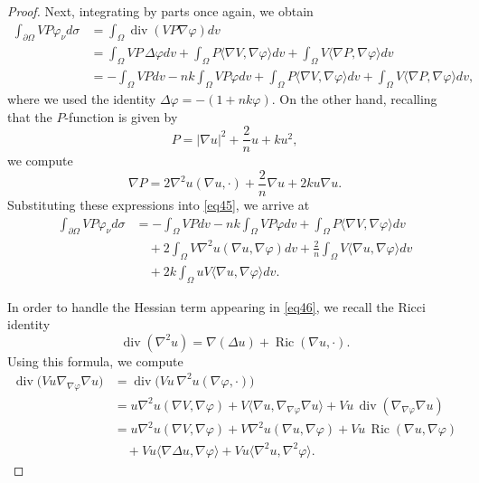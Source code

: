 \documentclass[10pt,a4paper]{amsart}
\begin{document}
\begin{proof}
Next, integrating by parts once again, we obtain
\begin{align}\label{eq45}
\int_{\partial\Omega}VP\varphi_{\nu}d\sigma
&=
\int_{\Omega}\operatorname{div}(VP\nabla\varphi)dv
\nonumber\\
&=
\int_{\Omega}VP\,\Delta\varphi dv
+
\int_{\Omega}P\langle\nabla V,\nabla\varphi\rangle dv
+
\int_{\Omega}V\langle\nabla P,\nabla\varphi\rangle dv
\nonumber\\
&=
-\int_{\Omega}VPdv
-nk\int_{\Omega}VP\varphi dv
+
\int_{\Omega}P\langle\nabla V,\nabla\varphi\rangle dv
+
\int_{\Omega}V\langle\nabla P,\nabla\varphi\rangle dv,
\end{align}
where we used the identity \(\Delta\varphi=-(1+nk\varphi)\). On the other hand, recalling that the \(P\)-function is given by
\begin{equation}\label{P_func1}
P=|\nabla u|^{2}+\frac{2}{n}u+ku^{2},    
\end{equation}
we compute
\begin{equation}\label{P_funct2}
\nabla P
=
2\nabla^{2}u(\nabla u,\cdot)
+\frac{2}{n}\nabla u
+2ku\nabla u.    
\end{equation}
Substituting these expressions into \eqref{eq45}, we arrive at
\begin{align}\label{eq46}
\int_{\partial\Omega}VP\varphi_{\nu} d\sigma
&=
-\int_{\Omega}VP dv
-nk\int_{\Omega}VP\varphi dv
+
\int_{\Omega}P\langle\nabla V,\nabla\varphi\rangle dv
\nonumber\\
&\quad
+
2\int_{\Omega}V\nabla^{2}u(\nabla u,\nabla\varphi)dv
+
\frac{2}{n}\int_{\Omega}V\langle\nabla u,\nabla\varphi\rangle dv
\nonumber\\
&\quad
+
2k\int_{\Omega}uV\langle\nabla u,\nabla\varphi\rangle dv.
\end{align}

In order to handle the Hessian term appearing in \eqref{eq46}, we recall the Ricci identity
\begin{equation}\label{Ricci_id}
\operatorname{div}(\nabla^2u)
=
\nabla(\Delta u)+\operatorname{Ric}(\nabla u,\cdot).    
\end{equation}
Using this formula, we compute
\begin{align}\label{eq_auxiliar}
\operatorname{div}\bigl(Vu\nabla_{\nabla\varphi}\nabla u\bigr)
&=
\operatorname{div}\bigl(Vu\,\nabla^{2}u(\nabla\varphi,\cdot)\bigr)
\nonumber\\
&=
u\nabla^{2}u(\nabla V,\nabla\varphi)
+
V\langle\nabla u,\nabla_{\nabla\varphi}\nabla u\rangle
+
Vu\,\operatorname{div}(\nabla_{\nabla\varphi}\nabla u)
\nonumber\\
&=
u\nabla^{2}u(\nabla V,\nabla\varphi)
+
V\nabla^{2}u(\nabla u,\nabla\varphi)
+
Vu\,\operatorname{Ric}(\nabla u,\nabla\varphi)
\nonumber\\
&\quad
+
Vu\langle\nabla\Delta u,\nabla\varphi\rangle
+
Vu\langle\nabla^{2}u,\nabla^{2}\varphi\rangle.
\end{align}


\end{proof}
\end{document}
